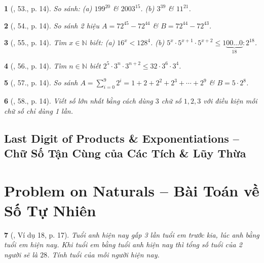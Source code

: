 \documentclass{article}
\newtheorem{baitoan}{}
\begin{document}
\begin{baitoan}[\cite{Tuyen_Toan_6}, 53., p. 14]
	So sánh: (a) $199^{20}$ \& $2003^{15}$. (b) $3^{39}$ \& $11^{21}$.
\end{baitoan}

\begin{baitoan}[\cite{Tuyen_Toan_6}, 54., p. 14]
	So sánh 2 hiệu $A = 72^{45} - 72^{44}$ \& $B = 72^{44} - 72^{43}$.
\end{baitoan}

\begin{baitoan}[\cite{Tuyen_Toan_6}, 55., p. 14]
	Tìm $x\in\mathbb{N}$ biết: (a) $16^x < 128^4$. (b) $5^x\cdot5^{x + 1}\cdot5^{x + 2}\le1\underbrace{00\ldots0}_{18}:2^{18}$.
\end{baitoan}

\begin{baitoan}[\cite{Tuyen_Toan_6}, 56., p. 14]
	Tìm $n\in\mathbb{N}$ biết $2^5\cdot3^n\cdot3^{n + 2}\le32\cdot3^6\cdot3^4$.
\end{baitoan}

\begin{baitoan}[\cite{Tuyen_Toan_6}, 57., p. 14]
	So sánh $A = \sum_{i=0}^9 2^i = 1 + 2 + 2^2 + 2^3 + \cdots + 2^9$ \& $B = 5\cdot2^8$.
\end{baitoan}

\begin{baitoan}[\cite{Tuyen_Toan_6}, 58., p. 14]
	Viết số lớn nhất bằng cách dùng $3$ chữ số $1,2,3$ với điều kiện mỗi chữ số chỉ dùng 1 lần.
\end{baitoan}


\subsection{Last Digit of Products \& Exponentiations -- Chữ Số Tận Cùng của Các Tích \& Lũy Thừa}


\section{Problem on Naturals -- Bài Toán về Số Tự Nhiên}

\begin{baitoan}[\cite{Binh_Toan_6_tap_1}, Ví dụ 18, p. 17]
	Tuổi anh hiện nay gấp 3 lần tuổi em trước kia, lúc anh bằng tuổi em hiện nay. Khi tuổi em bằng tuổi anh hiện nay thì tổng số tuổi của 2 người sẽ là $28$. Tính tuổi của mỗi người hiện nay.
\end{baitoan}
\end{document}
